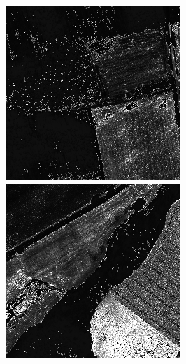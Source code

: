 \begin{figure}
    \includegraphics[width=\VegetationIndicesImageWidth]{images/vegetation/savi/4} \hfill
    \includegraphics[width=\VegetationIndicesImageWidth]{images/vegetation/savi/5}


\end{figure}
